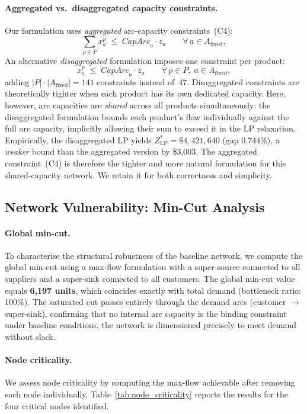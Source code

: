 \paragraph{Aggregated vs.\ disaggregated capacity constraints.}
Our formulation uses \emph{aggregated} arc-capacity constraints~(C4):
\[
  \sum_{p \in P} x_a^p \;\leq\; \mathit{CapArc}_a \cdot z_a
  \qquad \forall\, a \in A_{\text{fixed}},
\]
An alternative \emph{disaggregated} formulation imposes one
constraint per product:
\[
  x_a^p \;\leq\; \mathit{CapArc}_a \cdot z_a
  \qquad \forall\, p \in P,\; a \in A_{\text{fixed}},
\]
adding $|P| \cdot |A_{\text{fixed}}| = 141$ constraints instead
of~47.
Disaggregated constraints are theoretically tighter when each
product has its own dedicated capacity. Here, however, arc
capacities are \emph{shared} across all products simultaneously:
the disaggregated formulation bounds each product's flow
individually against the full arc capacity, implicitly allowing
their sum to exceed it in the LP relaxation.
Empirically, the disaggregated LP yields
$Z_{\text{LP}}^* = \$4{,}421{,}640$ (gap $0.744\%$), a
\emph{weaker} bound than the aggregated version by \$3{,}003.
The aggregated constraint~(C4) is therefore the tighter and more
natural formulation for this shared-capacity network.
We retain it for both correctness and simplicity.

\subsection*{Network Vulnerability: Min-Cut Analysis}

\paragraph{Global min-cut.}
To characterise the structural robustness of the baseline network,
we compute the global min-cut using a max-flow formulation with a
super-source connected to all suppliers and a super-sink connected
to all customers. The global min-cut value equals \textbf{6,197
units}, which coincides exactly with total demand (bottleneck
ratio: 100\%). The saturated cut passes entirely through the
demand arcs (customer $\rightarrow$ super-sink), confirming that
no internal arc capacity is the binding constraint under baseline
conditions, the network is dimensioned precisely to meet demand
without slack.

\paragraph{Node criticality.}
We assess node criticality by computing the max-flow achievable
after removing each node individually.
Table~\ref{tab:node_criticality} reports the results for the
four critical nodes identified.

